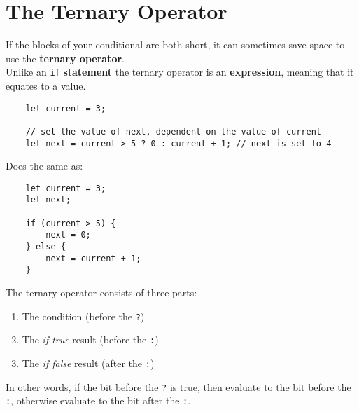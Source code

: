 \pagebreak

\section{The Ternary Operator}

If the blocks of your conditional are both short, it can sometimes save space to use the \textbf{ternary operator}.
\\

Unlike an \texttt{if} \textbf{statement} the ternary operator is an \textbf{expression}, meaning that it equates to a value.

\begin{verbatim}
    let current = 3;

    // set the value of next, dependent on the value of current
    let next = current > 5 ? 0 : current + 1; // next is set to 4
\end{verbatim}

Does the same as:

\begin{verbatim}
    let current = 3;
    let next;

    if (current > 5) {
        next = 0;
    } else {
        next = current + 1;
    }
\end{verbatim}

The ternary operator consists of three parts:

\begin{enumerate}
    \item The condition (before the \texttt{?})
    \item The \textit{if true} result (before the \texttt{:})
    \item The \textit{if false} result (after the \texttt{:})
\end{enumerate}

In other words, if the bit before the \texttt{?} is true, then evaluate to the bit before the \texttt{:}, otherwise evaluate to the bit after the \texttt{:}.

\pagebreak

